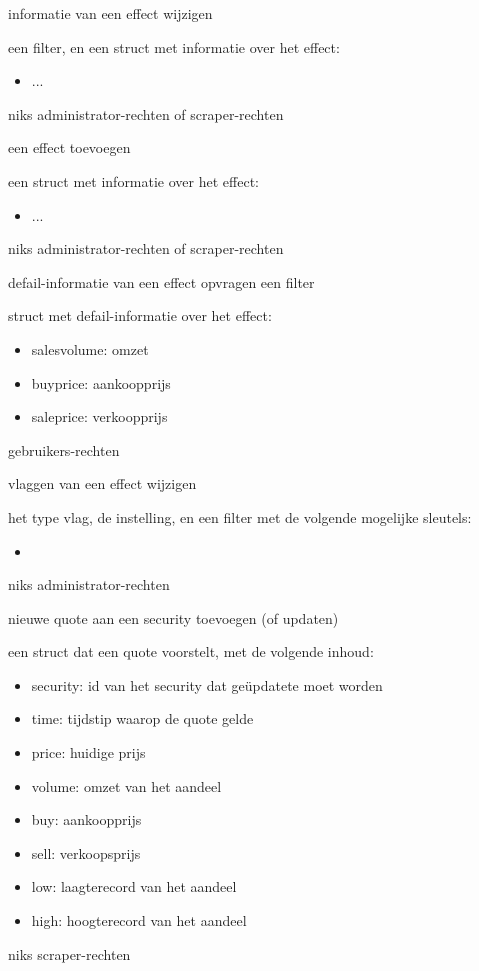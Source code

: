 	{ informatie van een effect wijzigen }
	{ een filter, en een struct met informatie over het effect:
		\begin{itemize}
		\item{...}
		\end{itemize} }
	{ niks }
	{ administrator-rechten of scraper-rechten }

	{ een effect toevoegen }
	{ een struct met informatie over het effect:
		\begin{itemize}
		\item{...}
		\end{itemize} }
	{ niks }
	{ administrator-rechten of scraper-rechten }

	{ defail-informatie van een effect opvragen }
	{ een filter }
	{ struct met defail-informatie over het effect:
		\begin{itemize}
		\item{salesvolume: omzet}
		\item{buyprice: aankoopprijs}
		\item{saleprice: verkoopprijs}
		\end{itemize} }
	{ gebruikers-rechten }

	{ vlaggen van een effect wijzigen }
	{ het type vlag, de instelling, en een filter met de volgende mogelijke sleutels:
		\begin{itemize}
		\item{}
		\end{itemize} }
	{ niks }
	{ administrator-rechten }

	{ nieuwe quote aan een security toevoegen (of updaten) }
	{ een struct dat een quote voorstelt, met de volgende inhoud:
		\begin{itemize}
		\item{security: id van het security dat ge\"updatete moet worden}
		\item{time: tijdstip waarop de quote gelde}
		\item{price: huidige prijs}
		\item{volume: omzet van het aandeel}
		\item{buy: aankoopprijs}
		\item{sell: verkoopsprijs}
		\item{low: laagterecord van het aandeel}
		\item{high: hoogterecord van het aandeel}
		\end{itemize} }
	{ niks }
	{ scraper-rechten }

